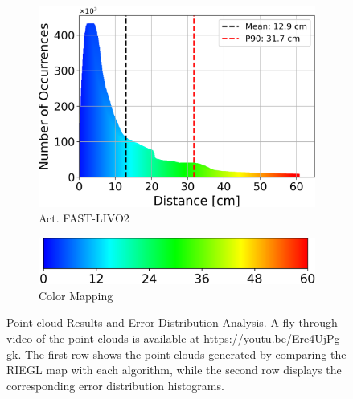 \documentclass[a4paper, conference]{IEEEtran}
\begin{document}
\begin{figure}
\begin{subfigure}{0.19\textwidth}
    \includegraphics[width=\textwidth]{pics/histogram_results/histogram_cond_actuated_livo.png}
    \caption{Act. FAST-LIVO2}
    \label{fig:hist_act_livo}
\end{subfigure}\vspace{2mm}
\begin{subfigure}{0.16\textwidth}
    \centering
    \includegraphics[width=\textwidth]{pics/histogram_results/hsv.png}
    \caption{Color Mapping}
    \label{fig:hsv}
\end{subfigure}
\caption{Point-cloud Results and Error Distribution Analysis. A fly through video of the point-clouds is available at \url{https://youtu.be/Ere4UjPg-gk}. 
The first row shows the point-clouds generated by comparing the RIEGL map with each algorithm, while the second row displays the corresponding error distribution histograms.}\vspace{-2mm}
\label{fig:combined_results}
\end{figure}
\end{document}
